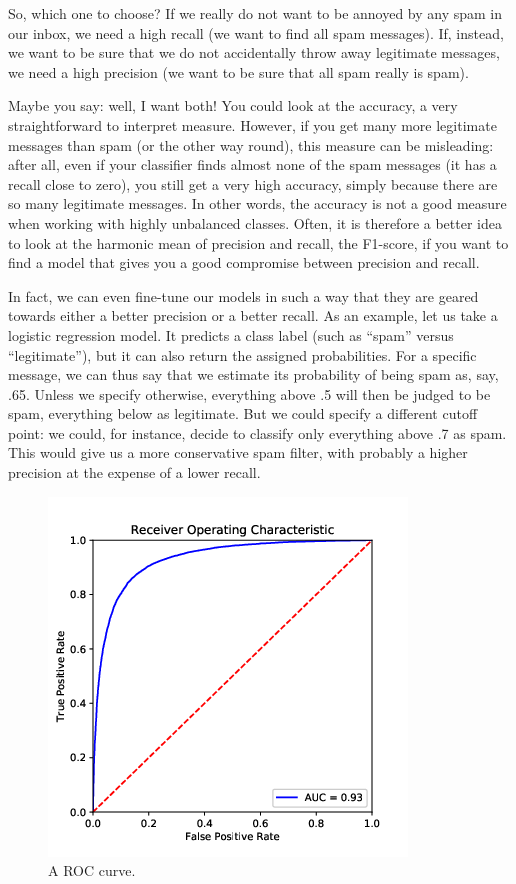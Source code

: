 So, which one to choose?  If we really do not want to be annoyed by
any spam in our inbox, we need a high recall (we want to find all spam
messages). If, instead, we want to be sure that we do not
accidentally throw away legitimate messages, we need a high
precision (we want to be sure that all spam really is spam).

Maybe you say: well, I want both!  You could look at the accuracy, a
very straightforward to interpret measure. However, if you get many
more legitimate messages than spam (or the other way round), this
measure can be misleading: after all, even if your classifier finds
almost none of the spam messages (it has a recall close to zero), you
still get a very high accuracy, simply because there are so many
legitimate messages. In other words, the accuracy is not a good measure when working with highly unbalanced classes.
Often, it is therefore a better idea to look at the harmonic mean of
precision and recall, the F1-score, if you want to find a model that
gives you a good compromise between precision and recall.


In fact, we can even fine-tune our models in such a way that they are
geared towards either a better precision or a better recall.
As an example, let us take a logistic regression model. It predicts a
class label (such as ``spam'' versus ``legitimate''), but it can also
return the assigned probabilities. For a specific message, we can thus
say that we estimate its probability of being spam as, say, .65.
Unless we specify otherwise, everything above .5 will then be judged
to be spam, everything below as legitimate. But we could specify a
different cutoff point: we could, for instance, decide to classify
only everything above .7 as spam. This would give us a more
conservative spam filter, with probably a higher precision at the
expense of a lower recall.

\begin{figure} 
\centering
\includegraphics[width=0.4\linewidth]{figures/ch09_roccurve}
\caption{A ROC curve.}
\label{fig:roccurve}
\end{figure}

